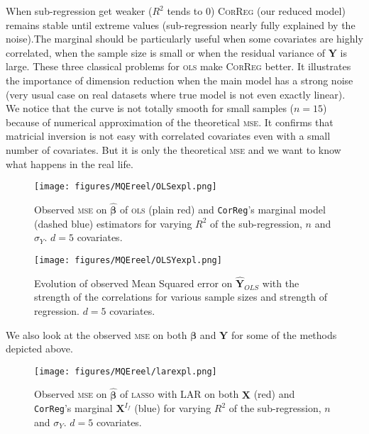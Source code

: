 \documentclass[12pt,a4paper]{report}
\begin{document}
When sub-regression get weaker ($R^2$ tends to 0) \textsc{CorReg} (our reduced model) remains stable until extreme values (sub-regression nearly fully explained by the noise).The marginal should be particularly useful when some covariates are highly correlated, when the sample size is small or when the residual variance of $\boldsymbol{Y}$ is large. These three classical problems for \textsc{ols} make \textsc{CorReg} better. It illustrates the importance of dimension reduction when the main model has a strong noise (very usual case on real datasets where true model is not even exactly linear). \\
	
	We notice that the curve is not totally smooth for small samples ($n=15$) because of numerical approximation of the theoretical \textsc{mse}. It confirms that matricial inversion is not easy with correlated covariates even with a small number of covariates. But it is only the theoretical \textsc{mse} and we want to know what happens in the real life. \\
	
 \begin{figure}[h!]
	\texttt{[image: figures/MQEreel/OLSexpl.png]}
	\caption{Observed \textsc{mse} on $\hat{\boldsymbol{\beta}}$ of \textsc{ols} (plain red) and {\tt CorReg}'s marginal model (dashed blue) estimators for varying $R^2$ of the sub-regression, $n$ and $\sigma_Y$. $d=5$ covariates.}\label{MSEOLSexpl}
\end{figure} 
	
	 \begin{figure}
	 \centering
	  \texttt{[image: figures/MQEreel/OLSYexpl.png]}
	  \caption{Evolution of observed Mean Squared error on $\hat{\boldsymbol{Y}}_{OLS}$ with the strength of the correlations for various sample sizes and strength of regression. $d=5$ covariates. } \label{MQEOLSYexpl}
	\end{figure}

	
	We also look at the observed \textsc{mse} on both $\boldsymbol{\beta}$ and $\boldsymbol{Y}$ for some of the methods depicted above.
	
 \begin{figure}[h!]
	\texttt{[image: figures/MQEreel/larexpl.png]}
	\caption{Observed \textsc{mse} on $\hat{\boldsymbol{\beta}}$ of \textsc{lasso} with LAR on both $\boldsymbol{X}$ (red) and {\tt CorReg}'s marginal $\boldsymbol{X}^{I_f}$ (blue) for varying $R^2$ of the sub-regression, $n$ and $\sigma_Y$. $d=5$ covariates.}\label{MSElarexpl}
\end{figure} 
	
\end{document}
